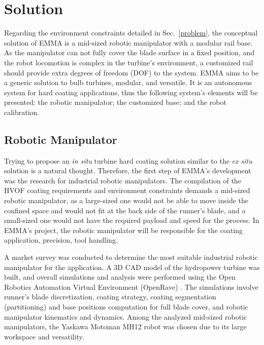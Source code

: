 \section{Solution}\label{solution}


Regarding the environment constraints detailed in Sec.~\ref{problem}, the
conceptual solution of EMMA is a mid-sized robotic manipulator with a modular
rail base. As the manipulator can not fully cover the blade surface in a
fixed position, and the robot locomotion is complex in the turbine's
environment, a customized rail should provide extra degrees of freedom (DOF) to
the system. EMMA aims to be a generic solution to bulb turbines, modular, and
versatile. It is an autonomous system for hard coating applications, thus
the following system's elements will be presented: the robotic manipulator; the
customized base; and the robot calibration.


\subsection{Robotic Manipulator}\label{manipulator}
Trying to propose an \textit{in situ} turbine hard coating solution similar to
the \textit{ex situ} solution is a natural thought. Therefore, the first step of
EMMA's development was the research for industrial robotic manipulators. The
compilation of the HVOF coating requirements and environment constraints demands
a mid-sized robotic manipulator, as a large-sized one would not be able to move
inside the confined space and would not fit at the back side of the
runner's blade, and a small-sized one would not have the required payload and
speed for the process. In EMMA's project, the robotic manipulator will be
responsible for the coating application, precision, tool handling.

A market survey was conducted to determine the most suitable industrial robotic
manipulator for the application. A 3D CAD model of the hydropower turbine was
built, and overall simulations and analysis were performed using the Open
Robotics Automation Virtual Environment (OpenRave) \cite{diankov2008openrave}.
The simulations involve runner's blade discretization, coating strategy,
coating segmentation (partitioning) and base positions computation for full
blade cover, and robotic manipulator kinematics and dynamics. Among the
analyzed mid-sized robotic manipulators, the Yaskawa Motoman MH12 robot was
chosen due to its large workspace and versatility.

